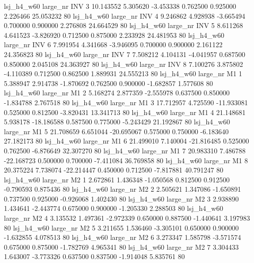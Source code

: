   lsj_h4_w60   large_nr      INV                 3 10.143552  5.305620  -3.453338 0.762500 0.925000  2.226466   25.053232 80
  lsj_h4_w60   large_nr      INV                 4  9.246862  4.928938  -3.665494 0.700000 0.900000  2.276808   24.664529 80
  lsj_h4_w60   large_nr      INV                 5  8.611268  4.641523  -3.826920 0.712500 0.875000  2.233928   24.481953 80
  lsj_h4_w60   large_nr      INV                 6  7.991954  4.341668  -3.946095 0.700000 0.900000  2.161122   24.356823 80
  lsj_h4_w60   large_nr      INV                 7  7.508212  4.104131  -4.041957 0.687500 0.850000  2.045108   24.363927 80
  lsj_h4_w60   large_nr      INV                 8  7.100276  3.875802  -4.110389 0.712500 0.862500  1.889931   24.555213 80
  lsj_h4_w60   large_nr       M1                 1  5.388947  2.914738  -1.870692 0.762500 0.900000 -1.682857    1.577608 80
  lsj_h4_w60   large_nr       M1                 2  5.168274  2.877359  -2.555978 0.637500 0.850000 -1.834788    2.767518 80
  lsj_h4_w60   large_nr       M1                 3 17.712957  4.725590 -11.933081 0.525000 0.812500 -3.820431   13.341713 80
  lsj_h4_w60   large_nr       M1                 4 21.148681  5.938178 -18.186588 0.587500 0.775000 -5.243429   21.192867 80
  lsj_h4_w60   large_nr       M1                 5 21.708659  6.651044 -20.695067 0.575000 0.750000 -6.183640   27.182173 80
  lsj_h4_w60   large_nr       M1                 6 21.499010  7.140004 -21.816485 0.525000 0.762500 -6.876649   32.307270 80
  lsj_h4_w60   large_nr       M1                 7 20.983310  7.486788 -22.168723 0.500000 0.700000 -7.411084   36.769858 80
  lsj_h4_w60   large_nr       M1                 8 20.375224  7.738074 -22.214447 0.450000 0.712500 -7.817881   40.791247 80
  lsj_h4_w60   large_nr       M2                 1  2.672861  1.436348  -1.050568 0.812500 0.912500 -0.790593    0.875436 80
  lsj_h4_w60   large_nr       M2                 2  2.505621  1.347086  -1.650891 0.737500 0.925000 -0.926068    1.402430 80
  lsj_h4_w60   large_nr       M2                 3  2.938890  1.434641  -2.443774 0.675000 0.900000 -1.205330    2.288503 80
  lsj_h4_w60   large_nr       M2                 4  3.135532  1.497361  -2.972339 0.650000 0.887500 -1.440641    3.197983 80
  lsj_h4_w60   large_nr       M2                 5  3.211655  1.536460  -3.305101 0.650000 0.900000 -1.632855    4.078513 80
  lsj_h4_w60   large_nr       M2                 6  3.273347  1.585798  -3.571574 0.675000 0.875000 -1.782769    4.965341 80
  lsj_h4_w60   large_nr       M2                 7  3.304433  1.643007  -3.773326 0.637500 0.837500 -1.914048    5.835761 80
